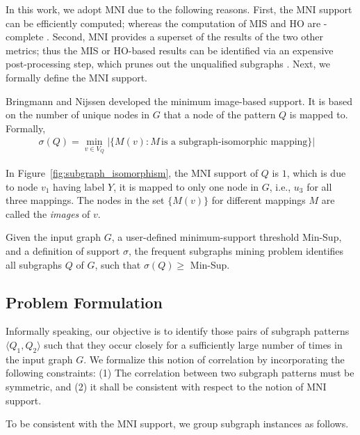 In this work, we adopt MNI  \cite{BN08}
due to the following reasons. First, the MNI support
can be efficiently computed; whereas the computation of MIS and HO are \NP-complete \cite{KK04,FB07}.
Second, MNI provides a superset of the results of the two other metrics; thus
the MIS or HO-based results can be identified via an expensive post-processing step,
which prunes out the unqualified subgraphs \cite{EASK14}.
Next, we formally define the MNI support.

 Bringmann and Nijssen \cite{BN08} developed the
minimum image-based support. It is based on the number of unique nodes in $G$ that a node of the pattern $Q$
is mapped to. Formally,
%
\begin{align}
\displaystyle \sigma(Q) = \min_{v \in V_Q} |\{M(v) : M \,\text{is a subgraph-isomorphic mapping}\}| &
\end{align}

In Figure~\ref{fig:subgraph_isomorphism}, the MNI support of $Q$ is $1$, which is due to
node $v_1$ having label $Y$, it is mapped to only one node in $G$, i.e., $u_3$ for all three
mappings. The nodes in the set $\{M(v)\}$ for different mappings $M$ are called the {\em images} of $v$.

 Given the input graph $G$, a user-defined minimum-support threshold {\sf Min-Sup}, and
a definition of support $\sigma$, the frequent subgraphs mining problem identifies all subgraphs $Q$ of $G$, such that
$\sigma(Q)\ge$ {\sf Min-Sup}.

\subsection{Problem Formulation}
\label{sec:problem}

Informally speaking, our objective is to identify those pairs of subgraph patterns $\langle Q_1, Q_2\rangle$ such that
they occur closely for a sufficiently large number of times in the input graph $G$. We formalize this notion of
correlation by incorporating the following constraints: (1) The correlation between two subgraph patterns must be
symmetric, and (2) it shall be consistent with respect to the notion of MNI support. 

To be consistent with the MNI support, we group subgraph instances as follows.

